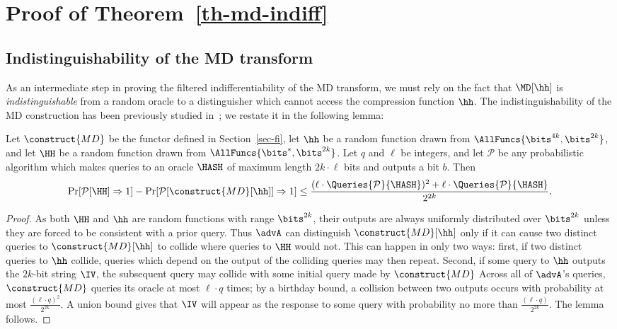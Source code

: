 \section{Proof of Theorem~\ref{th-md-indiff}}\label{apx-md-indiff}
\subsection{Indistinguishability of the MD transform}
As an intermediate step in proving the filtered indifferentiability of the MD transform, we must rely on the fact that $\MD[\hh]$ is \textit{indistinguishable} from a random oracle to a distinguisher which cannot access the compression function $\hh$.
The indistinguishability of the MD construction has been previously studied in~\cite{FOCS:BelCanKra96}; we restate it in the following lemma:
\begin{lemma}\label{th-md-indist}
	Let $\construct{MD}$ be the functor defined in Section~\ref{sec-fi}, let $\hh$ be a random function drawn from $\AllFuncs{\bits^{4k}, \bits^{2k}}$, and let $\HH$ be a random function drawn from $\AllFuncs{\bits^{*}, \bits^{2k}}$. 
	Let $q$ and $\ell$ be integers, and let $\mathcal{P}$ be any probabilistic algorithm which makes queries to an oracle $\HASH$ of maximum length $2k \cdot \ell$ bits and outputs a bit $b$. 
	Then
	\[ \Pr[\mathcal{P}[\HH] \Rightarrow 1] - \Pr[\mathcal{P}[\construct{MD}[\hh]] \Rightarrow 1] \leq \frac{(\ell \cdot \Queries{\mathcal{P}}{\HASH})^2 + \ell \cdot \Queries{\mathcal{P}}{\HASH}}{2^{2k}}.\]
\end{lemma}
\begin{proof}
	As both $\HH$ and $\hh$ are random functions with range $\bits^{2k}$, their outputs are always uniformly distributed over $\bits^{2k}$ unless they are forced to be consistent with a prior query.
	Thus $\advA$ can distinguish $\construct{MD}[\hh]$ only if it can cause two distinct queries to $\construct{MD}[\hh]$ to collide where queries to $\HH$ would not.
	This can happen in only two ways: first, if two distinct queries to $\hh$ collide, queries which depend on the output of the colliding queries may then repeat. Second, if some query to $\hh$ outputs the $2k$-bit string $\IV$, the subsequent query may collide with some initial query made by $\construct{MD}$
	Across all of $\advA$'s queries, $\construct{MD}$ queries its oracle at most $\ell \cdot q$ times; by a birthday bound,  a collision between two outputs occurs with probability at most $\frac{(\ell \cdot q)^2}{2^{2k}}$.
	A union bound gives that $\IV$ will appear as the response to some query with probability no more than $\frac{(\ell \cdot q)}{2^{2k}}$. 
	The lemma follows.
\end{proof}
